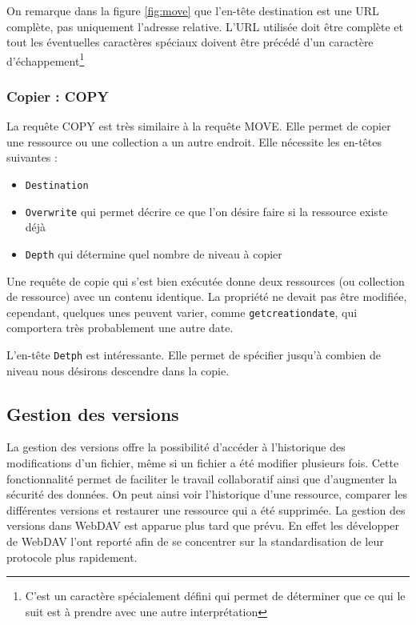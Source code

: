 \documentclass[a4paper, 11pt]{article}
\begin{document}
{				On remarque dans la figure \ref{fig:move} que l'en-tête destination est une URL complète, pas uniquement l'adresse relative. L'URL utilisée doit être complète et tout les éventuelles caractères spéciaux doivent être précédé d'un caractère d'échappement\footnote{C'est un caractère spécialement défini qui permet de déterminer que ce qui le suit est à prendre avec une autre interprétation}
				
			\subsubsection{Copier : COPY}
			
				La requête COPY est très similaire à la requête MOVE. Elle permet de copier une ressource ou une collection a un autre endroit. Elle nécessite les en-têtes suivantes :
				
					\begin{itemize}
						\item \texttt{Destination} 
						\item \texttt{Overwrite} qui permet décrire ce que l'on désire faire si la ressource existe déjà
						\item \texttt{Depth} qui détermine quel nombre de niveau à copier
					\end{itemize}
					
				Une requête de copie qui s'est bien exécutée donne deux ressources (ou collection de ressource) avec un contenu identique. La propriété ne devait pas être modifiée, cependant, quelques unes peuvent varier, comme \texttt{getcreationdate}, qui comportera très probablement une autre date.
				
				L'en-tête \texttt{Detph} est intéressante. Elle permet de spécifier jusqu'à combien de niveau nous désirons descendre dans la copie. 
		
	\subsection{Gestion des versions}
	
		La gestion des versions offre la possibilité d'accéder à l'historique des modifications d'un fichier, même si un fichier a été modifier plusieurs fois. Cette fonctionnalité permet de faciliter le travail collaboratif ainsi que d'augmenter la sécurité des données. On peut ainsi voir l'historique d'une ressource, comparer les différentes versions et restaurer une ressource qui a été supprimée. La gestion des versions dans WebDAV est apparue plus tard que prévu. En effet les développer de WebDAV l'ont reporté afin de se concentrer sur la standardisation de leur protocole plus rapidement. 
		
}
\end{document}
